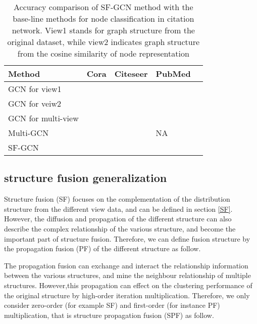 \documentclass[review]{elsarticle}
\begin{document}
\begin{table}[!ht]
\small
\renewcommand{\arraystretch}{1.0}
\caption{Accuracy comparison of SF-GCN method with the base-line methods for node classification in citation network. View1 stands for graph structure from the original dataset, while view2 indicates graph structure from the cosine similarity of node representation}
\label{table2}
\begin{center}
\newcommand{\tabincell}[2]{\begin{tabular}{@{}#1@{}}#2\end{tabular}}
\begin{tabular}{lp{1cm}p{1cm}p{1cm}p{1cm}}
\hline
\bfseries Method &\bfseries Cora &\bfseries Citeseer &\bfseries PubMed  \\
\hline \hline
GCN \cite{kipf2016semi} for view1  &    & &     \\
\hline
GCN \cite{kipf2016semi} for veiw2  &    & &    \\
\hline
GCN \cite{kipf2016semi} for multi-view  &    & &   \\
\hline
Multi-GCN  \cite{khan2019multi} &    &  &NA  \\
\hline\hline
SF-GCN  &    &  &   \\
\hline
\end{tabular}
\end{center}
\end{table}

\subsection{structure fusion generalization}
\label{generalization}
Structure fusion (SF) focuses on the complementation of the distribution structure from the different view data, and  can be defined in section \ref{SF}.  However, the diffusion \cite{yang2012affinity} \cite{bai2017regularized} \cite{bai2017regularized} and propagation\cite{LINGF2018} \cite{Lin2018structure} of the different structure can also describe the complex relationship of the various structure, and become the important part of structure fusion. Therefore, we can define fusion structure  by the propagation fusion (PF) of the different structure as follow.

The propagation fusion can exchange and interact the relationship information between the various structures, and mine the neighbour relationship of multiple structures. However,this propagation can effect on the clustering performance of the original structure by high-order iteration multiplication. Therefore, we only consider zero-order (for example SF) and first-order (for instance PF) multiplication, that is structure propagation fusion (SPF) as follow.
\end{document}
